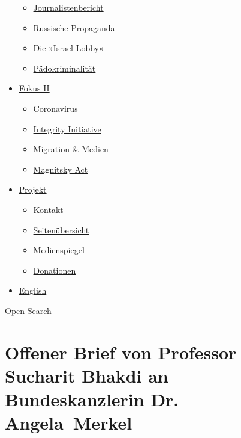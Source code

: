\begin{itemize}
  \begin{itemize}
  \tightlist
  \item
    \href{https://swprs.org/bericht-eines-journalisten/}{Journalistenbericht}
  \item
    \href{https://swprs.org/russische-propaganda/}{Russische Propaganda}
  \item
    \href{https://swprs.org/die-israel-lobby-fakten-und-mythen/}{Die
    »Israel-Lobby«}
  \item
    \href{https://swprs.org/geopolitik-und-paedokriminalitaet/}{Pädokriminalität}
  \end{itemize}
\item
  \href{https://swprs.org/migration-und-medien/}{Fokus II}

  \begin{itemize}
  \tightlist
  \item
    \href{https://swprs.org/covid-19-hinweis-ii/}{Coronavirus}
  \item
    \href{https://swprs.org/die-integrity-initiative/}{Integrity
    Initiative}
  \item
    \href{https://swprs.org/migration-und-medien/}{Migration \& Medien}
  \item
    \href{https://swprs.org/der-fall-magnitsky/}{Magnitsky Act}
  \end{itemize}
\item
  \href{https://swprs.org/kontakt/}{Projekt}

  \begin{itemize}
  \tightlist
  \item
    \href{https://swprs.org/kontakt/}{Kontakt}
  \item
    \href{https://swprs.org/uebersicht/}{Seitenübersicht}
  \item
    \href{https://swprs.org/medienspiegel/}{Medienspiegel}
  \item
    \href{https://swprs.org/donationen/}{Donationen}
  \end{itemize}
\item
  \href{https://swprs.org/contact/}{English}
\end{itemize}

\protect\hyperlink{}{Open Search}

\hypertarget{offener-brief-von-professor-sucharit-bhakdi-an-bundeskanzlerin-dr-angela-merkel}{%
\section{Offener Brief von Professor Sucharit Bhakdi an Bundeskanzlerin
Dr.
Angela~Merkel}\label{offener-brief-von-professor-sucharit-bhakdi-an-bundeskanzlerin-dr-angela-merkel}}

